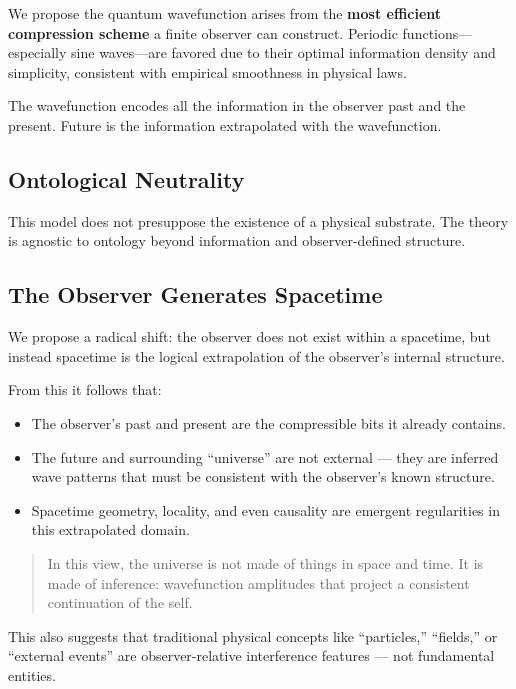 \documentclass[11pt]{article}
\begin{document}
We propose the quantum wavefunction arises from the \textbf{most efficient compression scheme} a finite observer can construct. Periodic functions—especially sine waves—are favored due to their optimal information density and simplicity, consistent with empirical smoothness in physical laws.

The wavefunction encodes all the information in the observer past and the present. Future is the information extrapolated with the wavefunction.


\subsection{Ontological Neutrality}

This model does not presuppose the existence of a physical substrate. The theory is agnostic to ontology beyond information and observer-defined structure.

\subsection{The Observer Generates Spacetime}

We propose a radical shift: the observer does not exist within a spacetime, but instead spacetime is the logical extrapolation of the observer’s internal structure.

From this it follows that:

\begin{itemize}
    \item The observer’s past and present are the compressible bits it already contains.
    \item The future and surrounding “universe” are not external — they are inferred wave patterns that must be consistent with the observer’s known structure.
    \item Spacetime geometry, locality, and even causality are emergent regularities in this extrapolated domain.
\end{itemize}

\begin{quote}
    In this view, the universe is not made of things in space and time. It is made of inference: wavefunction amplitudes that project a consistent continuation of the self.
\end{quote}

This also suggests that traditional physical concepts like “particles,” “fields,” or “external events” are observer-relative interference features — not fundamental entities.
\end{document}

